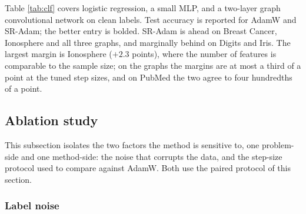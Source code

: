 \documentclass[a4paper,fleqn]{cas-sc}
\theoremstyle{plain}
\theoremstyle{definition}
\theoremstyle{remark}
\begin{document}
Table \ref{tab:clf} covers logistic regression, a small MLP, and a two-layer graph convolutional network \citep{kipf2017} on clean labels. Test accuracy is reported for AdamW and SR-Adam; the better entry is bolded. SR-Adam is ahead on Breast Cancer, Ionosphere and all three graphs, and marginally behind on Digits and Iris. The largest margin is Ionosphere ($+2.3$ points), where the number of features is comparable to the sample size; on the graphs the margins are at most a third of a point at the tuned step sizes, and on PubMed the two agree to four hundredths of a point.

\begin{table}%
\centering
\caption{Classification test accuracy (per cent), clean training labels. Models: logistic regression, one-hidden-layer MLP, and GCN \citep{kipf2017}. Bold $=$ higher accuracy.}
\label{tab:clf}

\end{table}

\subsection{Ablation study}
This subsection isolates the two factors the method is sensitive to, one problem-side and one method-side: the noise that corrupts the data, and the step-size protocol used to compare against AdamW. Both use the paired protocol of this section.
\subsubsection{Label noise}
\end{document}
